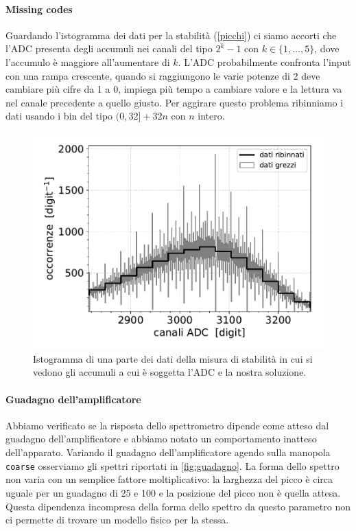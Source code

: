 \paragraph{Missing codes}

Guardando l'istogramma dei dati per la stabilità (\autoref{picchi})
ci siamo accorti che l'ADC presenta degli accumuli nei canali del tipo $2^{k} - 1$ con $k\in\{1,\dots,5\}$,
dove l'accumulo è maggiore all'aumentare di $k$.
L'ADC probabilmente confronta l'input con una rampa crescente,
quando si raggiungono le varie potenze di 2 deve cambiare più cifre da 1 a 0,
impiega più tempo a cambiare valore e la lettura va nel canale precedente a quello giusto.
Per aggirare questo problema ribinniamo i dati usando i bin del tipo $(0,32]+32n$ con $n$ intero.

\begin{figure}[h]
\centering
\includegraphics[width=25 em]{immagini/rebin}
\caption{Istogramma di una parte dei dati della misura di stabilità in cui si vedono gli accumuli a cui è soggetta l'ADC e la nostra soluzione.}
\label{picchi}
\end{figure}

\paragraph{Guadagno dell'amplificatore}

Abbiamo verificato se la risposta dello spettrometro dipende come atteso dal guadagno dell'amplificatore
e abbiamo notato un comportamento inatteso dell'apparato.
Variando il guadagno dell'amplificatore agendo sulla manopola \texttt{coarse}
osserviamo gli spettri riportati in \autoref{fig:guadagno}.
La forma dello spettro non varia con un semplice fattore moltiplicativo:
la larghezza del picco è circa uguale per un guadagno di 25 e 100
e la posizione del picco non è quella attesa.
Questa dipendenza incompresa della forma dello spettro da questo parametro
non ci permette di trovare un modello fisico per la stessa.

